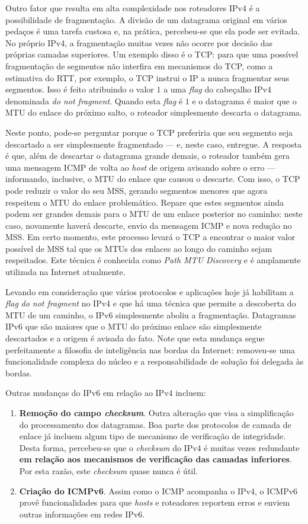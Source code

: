 \documentclass{article}
\begin{document}
Outro fator que resulta em alta complexidade nos roteadores IPv4 é a possibilidade de fragmentação. A divisão de um datagrama original em vários pedaços é uma tarefa custosa e, na prática, percebeu-se que ela pode ser evitada. No próprio IPv4, a fragmentação muitas vezes não ocorre por decisão das próprias camadas superiores. Um exemplo disso é o TCP: para que uma possível fragmentação de segmentos não interfira em mecanismos do TCP, como a estimativa do RTT, por exemplo, o TCP instrui o IP a nunca fragmentar seus segmentos. Isso é feito atribuindo o valor $1$ a uma \textit{flag} do cabeçalho IPv4 denominada \textit{do not fragment}. Quando esta \textit{flag} é $1$ e o datagrama é maior que o MTU do enlace do próximo salto, o roteador simplesmente descarta o datagrama.

Neste ponto, pode-se perguntar porque o TCP preferiria que seu segmento seja descartado a ser simplesmente fragmentado --- e, neste caso, entregue. A resposta é que, além de descartar o datagrama grande demais, o roteador também gera uma mensagem ICMP de volta ao \textit{host} de origem avisando sobre o erro --- informando, inclusive, o MTU do enlace que causou o descarte. Com isso, o TCP pode reduzir o valor do seu MSS, gerando segmentos menores que agora respeitem o MTU do enlace problemático. Repare que estes segmentos ainda podem ser grandes demais para o MTU de um enlace posterior no caminho: neste caso, novamente haverá descarte, envio da mensagem ICMP e nova redução no MSS. Em certo momento, este processo levará o TCP a encontrar o maior valor possível de MSS tal que os MTUs dos enlaces ao longo do caminho sejam respeitados. Este técnica é conhecida como \textit{Path MTU Discovery} e é amplamente utilizada na Internet atualmente.

Levando em consideração que vários protocolos e aplicações hoje já habilitam a \textit{flag} \textit{do not fragment} no IPv4 e que há uma técnica que permite a descoberta do MTU de um caminho, o IPv6 simplesmente aboliu a fragmentação. Datagramas IPv6 que são maiores que o MTU do próximo enlace são simplesmente descartados e a origem é avisada do fato. Note que esta mudança segue perfeitamente a filosofia de inteligência nas bordas da Internet: removeu-se uma funcionalidade complexa do núcleo e a responsabilidade de solução foi delegada às bordas.

Outras mudanças do IPv6 em relação ao IPv4 incluem:
\begin{enumerate}
    \item \textbf{Remoção do campo \textit{checksum}}. Outra alteração que visa a simplificação do processamento dos datagramas. Boa parte dos protocolos de camada de enlace já incluem algum tipo de mecanismo de verificação de integridade. Desta forma, percebeu-se que o \textit{checksum} do IPv4 é muitas vezes redundante \textbf{em relação aos mecanismos de verificação das camadas inferiores}. Por esta razão, este \textit{checksum} quase nunca é útil.
    \item \textbf{Criação do ICMPv6}. Assim como o ICMP acompanha o IPv4, o ICMPv6 provê funcionalidades para que \textit{hosts} e roteadores reportem erros e enviem outras informações em redes IPv6.
\end{enumerate}
\end{document}

